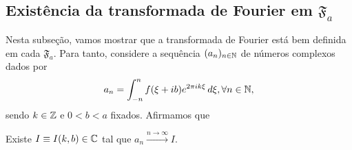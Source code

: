     \subsection{Existência da transformada de Fourier em \texorpdfstring{$\mathfrak{F}_a$}{Fa}}
        Nesta subseção, vamos mostrar que a transformada de Fourier está bem definida em cada $\mathfrak{F}_a$.
        Para tanto, considere a sequência $(a_n)_{n\in\mathbb{N}}$ de números complexos dados por
        \begin{equation*}
            a_n = \int_{-n}^n f(\xi + ib)e^{2\pi ik\xi} \, d\xi, \forall n\in\mathbb{N},
        \end{equation*}
        sendo $k\in\mathbb{Z}$ e $0<b<a$ fixados. Afirmamos que
        \begin{proposicao}
        \label{prop-transf-fourier-definida-fa}
            Existe $I \equiv I(k,b) \in\mathbb{C}$ tal que $a_n\xrightarrow{n\to\infty} I$.
        \end{proposicao}
